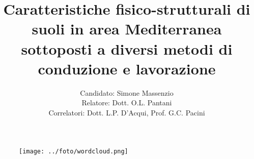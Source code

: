 \documentclass[10pt]{beamer}
\title[25 anni di conduzione biologica in area Mediterranea: uno
studio di fisica del suolo] %
{ Caratteristiche fisico-strutturali di suoli in area Mediterranea
  sottoposti a diversi metodi di conduzione e lavorazione}
\author[Simone Massenzio]{ 
  Candidato: Simone Massenzio \\
  Relatore: Dott. O.L. Pantani\\
  \vspace{0.1cm}
  Correlatori:
  Dott. L.P. D'Acqui, Prof. G.C. Pacini}
\institute[] { \emph{Dipartimento di Scienze della Produzioni Animali e
    dell'Ambiente\\
    Universit\`a degli studi di Firenze - UniFI\\}
  
}
\date{\displaydate{date}}
\begin{document}
{\1
  \begin{frame}[noframenumbering]%
    \titlepage
  \end{frame}}




\begin{frame}
\vspace{2cm}
\begin{figure}
\centering
\texttt{[image: ../foto/wordcloud.png]}
\end{figure}
\end{frame}
\end{document}

